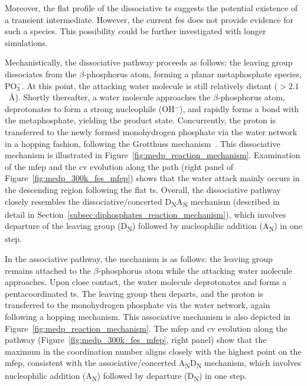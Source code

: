 Moreover, the flat profile of the dissociative \ac{ts} suggests the potential existence of a transient intermediate. However, the current \ac{fes} does not provide evidence for such a species. This possibility could be further investigated with longer simulations.

Mechanistically, the dissociative pathway proceeds as follows: the leaving group dissociates from the $\beta$-phosphorus atom, forming a planar metaphosphate species, PO$_3^-$. At this point, the attacking water molecule is still relatively distant ($>2.1$~\AA). Shortly thereafter, a water molecule approaches the $\beta$-phosphorus atom, deprotonates to form a strong nucleophile (OH$^-$), and rapidly forms a bond with the metaphosphate, yielding the product state. Concurrently, the proton is transferred to the newly formed monohydrogen phosphate via the water network in a hopping fashion, following the Grotthuss mechanism~\citep{degrotthussDecompositionLeauCorps1806, cukiermanTuGrotthussOther2006}. This dissociative mechanism is illustrated in Figure~\ref{fig:medp_reaction_mechanism}. Examination of the \ac{mfep} and the \ac{cv} evolution along the path (right panel of Figure~\ref{fig:medp_300k_fes_mfep}) shows that the water attack mainly occurs in the descending region following the flat \ac{ts}. Overall, the dissociative pathway closely resembles the dissociative/concerted D\textsubscript{N}A\textsubscript{N} mechanism (described in detail in Section~\ref{subsec:diphosphates_reaction_mechanism}), which involves departure of the leaving group (D\textsubscript{N}) followed by nucleophilic addition (A\textsubscript{N}) in one step.

In the associative pathway, the mechanism is as follows: the leaving group remains attached to the $\beta$-phosphorus atom while the attacking water molecule approaches. Upon close contact, the water molecule deprotonates and forms a pentacoordinated \ac{ts}. The leaving group then departs, and the proton is transferred to the monohydrogen phosphate via the water network, again following a hopping mechanism. This associative mechanism is also depicted in Figure~\ref{fig:medp_reaction_mechanism}. The \ac{mfep} and \ac{cv} evolution along the pathway (Figure~\ref{fig:medp_300k_fes_mfep}, right panel) show that the maximum in the coordination number aligns closely with the highest point on the \ac{mfep}, consistent with the associative/concerted A\textsubscript{N}D\textsubscript{N} mechanism, which involves nucleophilic addition (A\textsubscript{N}) followed by departure (D\textsubscript{N}) in one step.

